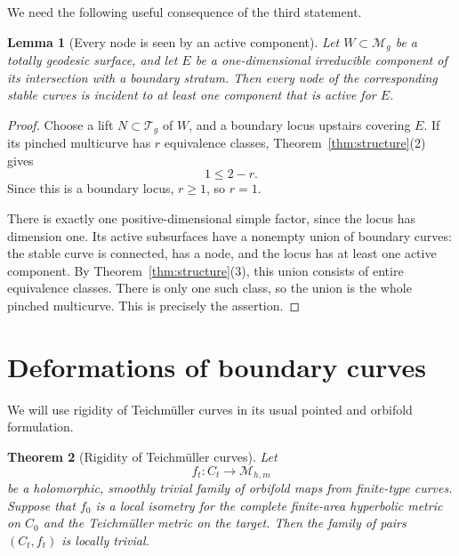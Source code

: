 \documentclass[11pt]{article}
\newcommand{\M}{\mathcal M}
\newcommand{\T}{\mathcal T}
\newtheorem{theorem}{Theorem}[section]
\newtheorem{lemma}[theorem]{Lemma}
\theoremstyle{remark}
\begin{document}
We need the following useful consequence of the third statement.

\begin{lemma}[Every node is seen by an active component]\label{lem:active}
Let \(W\subset\M_g\) be a totally geodesic surface, and let \(E\)
be a one-dimensional irreducible component of its intersection
with a boundary stratum. Then every node of the corresponding
stable curves is incident to at least one component that is
active for \(E\).
\end{lemma}

\begin{proof}
Choose a lift \(N\subset\T_g\) of \(W\), and a boundary locus
upstairs covering \(E\). If its pinched multicurve has \(r\)
equivalence classes, Theorem~\ref{thm:structure}(2) gives
\[
1\leq 2-r.
\]
Since this is a boundary locus, \(r\geq1\), so \(r=1\).

There is exactly one positive-dimensional simple factor, since
the locus has dimension one. Its active subsurfaces have a
nonempty union of boundary curves: the stable curve is connected,
has a node, and the locus has at least one active component.
By Theorem~\ref{thm:structure}(3), this union consists of entire
equivalence classes. There is only one such class, so the union
is the whole pinched multicurve. This is precisely the assertion.
\end{proof}


\section{Deformations of boundary curves}

We will use rigidity of Teichm\"uller curves in its usual
pointed and orbifold formulation.

\begin{theorem}[Rigidity of Teichm\"uller curves]\label{thm:McM}
Let
\[
f_t:C_t\longrightarrow \M_{h,m}
\]
be a holomorphic, smoothly trivial family of orbifold maps from
finite-type curves. Suppose that \(f_0\) is a local isometry for
the complete finite-area hyperbolic metric on \(C_0\) and the
Teichm\"uller metric on the target. Then the family of pairs
\((C_t,f_t)\) is locally trivial.
\end{theorem}
\end{document}
